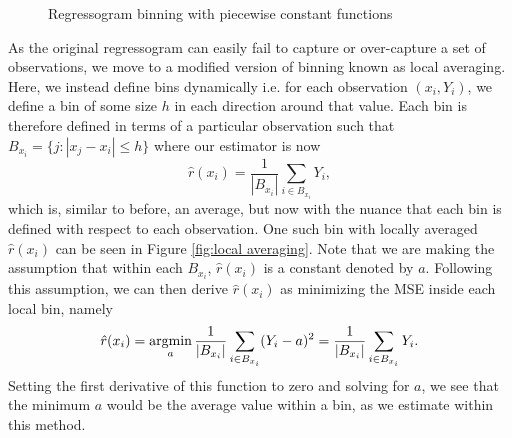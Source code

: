 \begin{figure}
	\begin{center}
		\caption{Regressogram binning with piecewise constant functions}
		\label{fig:regressogram}
	\end{center}
\end{figure}


As the original regressogram can easily fail to capture or over-capture a set of observations, we move to a modified version of binning known as local averaging. Here, we instead define bins dynamically i.e. for each observation $(x_i, Y_i)$, we define a bin of some size $h$ in each direction around that value. Each bin is therefore defined in terms of a particular observation such that $B_{x_i} = \{j: |x_j -x_i| \leq h\}$ where our estimator is now \begin{equation} \hat{r}(x_i) = \frac{1}{|B_{x_i}|}\sum_{i \in B_{x_i}} Y_i,\end{equation} 
which is, similar to before, an average, but now with the nuance that each bin is defined with respect to each observation. One such bin with locally averaged $\hat{r}(x_i)$ can be seen in Figure \ref{fig:local averaging}. Note that we are making the assumption that within each $B_{x_i}$, $\hat{r}(x_i)$ is a constant denoted by $a$. Following this assumption, we can then derive $\hat{r}(x_i)$ as minimizing the MSE inside each local bin, namely
\begin{equation}
	\hat{r}(x_i) = \operatorname*{\textup{argmin}}_{a} \frac{1}{|B_{x_i}|}\sum_{i \in B_{x_i}} (Y_i - a)^2 = \frac{1}{|B_{x_i}|}\sum_{i \in B_{x_i}} Y_i.
\end{equation}
Setting the first derivative of this function to zero and solving for $a$, we see that the minimum $a$ would be the average value within a bin, as we estimate within this method.

